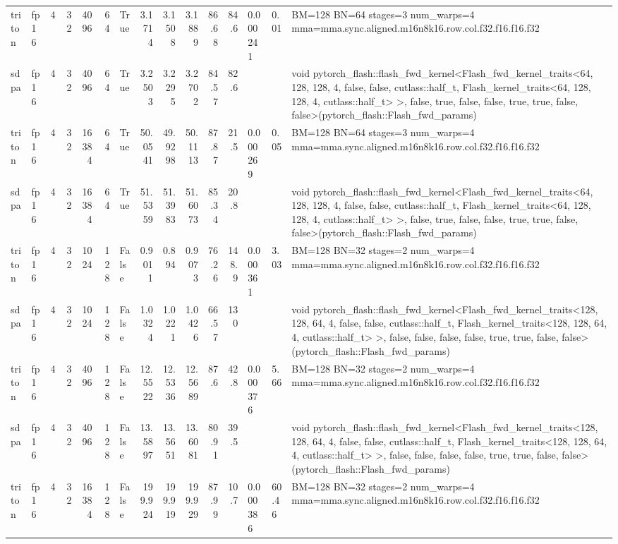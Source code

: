 \begin{table}[htbp]
\begin{tabular}{llrrrrlrrrrrlll}
    triton & fp16 & 4 & 32 & 4096 & 64 & True & 3.1714 & 3.1508 & 3.1889 & 86.68 & 84.6 & 0.000241 & 0.01 & BM=128 BN=64 stages=3 num\_warps=4 mma=mma.sync.aligned.m16n8k16.row.col.f32.f16.f16.f32 \\
    sdpa & fp16 & 4 & 32 & 4096 & 64 & True & 3.2503 & 3.2295 & 3.2702 & 84.57 & 82.6 &  &  & void pytorch\_flash::flash\_fwd\_kernel<Flash\_fwd\_kernel\_traits<64, 128, 128, 4, false, false, cutlass::half\_t, Flash\_kernel\_traits<64, 128, 128, 4, cutlass::half\_t> >, false, true, false, false, true, true, false, false>(pytorch\_flash::Flash\_fwd\_params) \\
    triton & fp16 & 4 & 32 & 16384 & 64 & True & 50.0541 & 49.9298 & 50.1113 & 87.87 & 21.5 & 0.000269 & 0.05 & BM=128 BN=64 stages=3 num\_warps=4 mma=mma.sync.aligned.m16n8k16.row.col.f32.f16.f16.f32 \\
    sdpa & fp16 & 4 & 32 & 16384 & 64 & True & 51.5359 & 51.3983 & 51.6073 & 85.34 & 20.8 &  &  & void pytorch\_flash::flash\_fwd\_kernel<Flash\_fwd\_kernel\_traits<64, 128, 128, 4, false, false, cutlass::half\_t, Flash\_kernel\_traits<64, 128, 128, 4, cutlass::half\_t> >, false, true, false, false, true, true, false, false>(pytorch\_flash::Flash\_fwd\_params) \\
    triton & fp16 & 4 & 32 & 1024 & 128 & False & 0.9011 & 0.894 & 0.9073 & 76.26 & 148.9 & 0.000361 & 3.03 & BM=128 BN=32 stages=2 num\_warps=4 mma=mma.sync.aligned.m16n8k16.row.col.f32.f16.f16.f32 \\
    sdpa & fp16 & 4 & 32 & 1024 & 128 & False & 1.0324 & 1.0221 & 1.0426 & 66.57 & 130 &  &  & void pytorch\_flash::flash\_fwd\_kernel<Flash\_fwd\_kernel\_traits<128, 128, 64, 4, false, false, cutlass::half\_t, Flash\_kernel\_traits<128, 128, 64, 4, cutlass::half\_t> >, false, false, false, false, true, true, false, false>(pytorch\_flash::Flash\_fwd\_params) \\
    triton & fp16 & 4 & 32 & 4096 & 128 & False & 12.5522 & 12.5336 & 12.5689 & 87.6 & 42.8 & 0.000376 & 5.66 & BM=128 BN=32 stages=2 num\_warps=4 mma=mma.sync.aligned.m16n8k16.row.col.f32.f16.f16.f32 \\
    sdpa & fp16 & 4 & 32 & 4096 & 128 & False & 13.5897 & 13.5651 & 13.6081 & 80.91 & 39.5 &  &  & void pytorch\_flash::flash\_fwd\_kernel<Flash\_fwd\_kernel\_traits<128, 128, 64, 4, false, false, cutlass::half\_t, Flash\_kernel\_traits<128, 128, 64, 4, cutlass::half\_t> >, false, false, false, false, true, true, false, false>(pytorch\_flash::Flash\_fwd\_params) \\
    triton & fp16 & 4 & 32 & 16384 & 128 & False & 199.924 & 199.919 & 199.929 & 87.99 & 10.7 & 0.000386 & 60.46 & BM=128 BN=32 stages=2 num\_warps=4 mma=mma.sync.aligned.m16n8k16.row.col.f32.f16.f16.f32 \\

\end{tabular}
\end{table}
